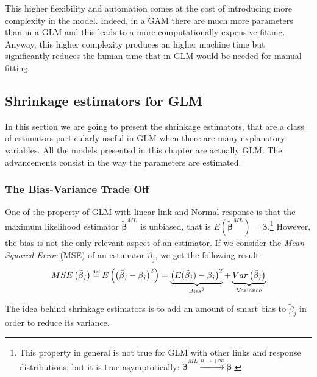 \documentclass[a4paper, nobind]{templates/ociamthesis}
\newcommand\eqdef{\mathrel{\overset{\makebox[0pt]{\mbox{\normalfont\tiny def}}}{=}}}
\theoremstyle{definition}
\theoremstyle{definition}
\theoremstyle{definition}
\theoremstyle{remark}
\begin{document}
This higher flexibility and automation comes at the cost of introducing more complexity in the model. Indeed, in a GAM there are much more parameters than in a GLM and this leads to a more computationally expensive fitting. Anyway, this higher complexity produces an higher machine time but significantly reduces the human time that in GLM would be needed for manual fitting.

\newpage

\hypertarget{shrinkage-estimators-for-glm}{%
\subsection{Shrinkage estimators for GLM}\label{shrinkage-estimators-for-glm}}

In this section we are going to present the shrinkage estimators, that are a class of estimators particularly useful in GLM when there are many explanatory variables. All the models presented in this chapter are actually GLM. The advancements consist in the way the parameters are estimated.

\hypertarget{the-bias-variance-trade-off}{%
\subsubsection{The Bias-Variance Trade Off}\label{the-bias-variance-trade-off}}

One of the property of GLM with linear link and Normal response is that the maximum likelihood estimator \(\boldsymbol{\tilde{\beta}}^{ML}\) is unbiased, that is \(E\left(\boldsymbol{\tilde{\beta}}^{ML}\right) = \boldsymbol{\beta}\).\footnote{This property in general is not true for GLM with other links and response distributions, but it is true asymptotically: \(\boldsymbol{\tilde{\beta}}^{ML} \xrightarrow{n\to+\infty} \boldsymbol{\beta}\).} However, the bias is not the only relevant aspect of an estimator. If we consider the \emph{Mean Squared Error} (MSE) of an estimator \(\tilde{\beta}_j\), we get the following result:
\begin{equation}
\label{eq:bias-variance}
MSE\left(\tilde{\beta}_j\right) \eqdef E\left(\left(\tilde{\beta}_j - \beta_j\right)^2\right) =
\underbrace{\left( E(\tilde{\beta}_j)-\beta_j \right)^2}_{\text{Bias}^2} + 
\underbrace{Var\left( \tilde{\beta}_j \right)}_{\text{Variance}}
\end{equation}

The idea behind shrinkage estimators is to add an amount of smart bias to \(\tilde{\beta}_j\) in order to reduce its variance.
\end{document}

